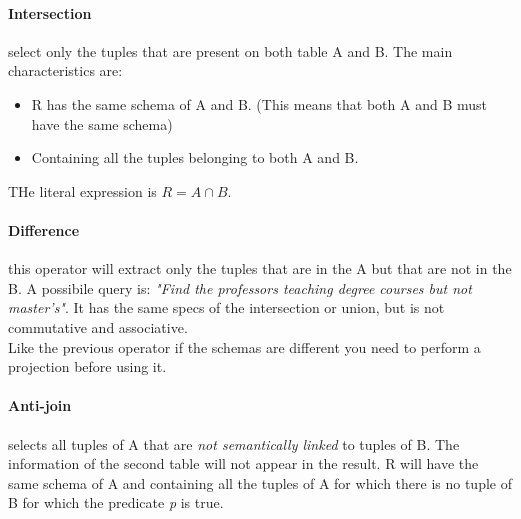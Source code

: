 \documentclass[12pt]{article}
\begin{document}
\paragraph{Intersection} select only the tuples that are present on both table A and B. The main characteristics are:
\begin{itemize}
  \item R has the same schema of A and B. (This means that both A and B must have the same schema)
  \item Containing all the tuples belonging to both A and B.
\end{itemize}
THe literal expression is $R=A \cap B$.

\paragraph{Difference} this operator will extract only the tuples that are in the A but that are not in the B. A possibile query is: \textit{"Find the professors teaching degree courses but not master's"}. It has the same specs of the intersection or union, but is not commutative and associative.\\
Like the previous operator if the schemas are different you need to perform a projection before using it.

\paragraph{Anti-join} selects all tuples of A that are \textit{not semantically linked} to tuples of B. The information of the second table will not appear in the result. R will have the same schema of A and containing all the tuples of A for which there is no tuple of B for which the predicate \textit{p} is true.
\end{document}
